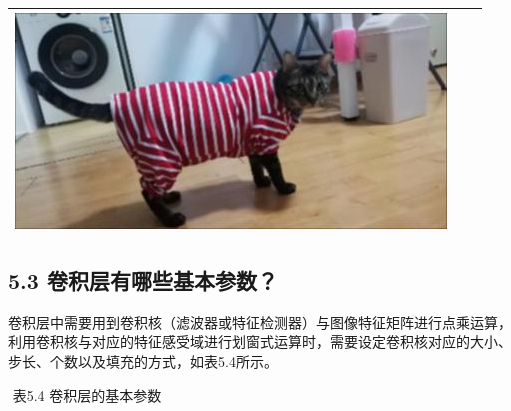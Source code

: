 \begin{longtable}[]{@{}ccc@{}}
\begin{minipage}[t]{0.34\columnwidth}
\includegraphics{./img/ch5/cat-blur-gaussian.jpg}\strut
\end{minipage}\tabularnewline
\bottomrule
\end{longtable}

\subsection{5.3
卷积层有哪些基本参数？}\label{ux5377ux79efux5c42ux6709ux54eaux4e9bux57faux672cux53c2ux6570}

​
卷积层中需要用到卷积核（滤波器或特征检测器）与图像特征矩阵进行点乘运算，利用卷积核与对应的特征感受域进行划窗式运算时，需要设定卷积核对应的大小、步长、个数以及填充的方式，如表5.4所示。

​ 表5.4 卷积层的基本参数

